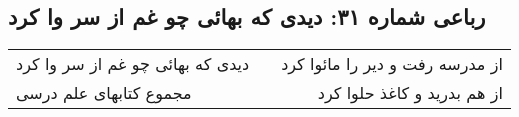 \begin{center}
\section*{رباعی شماره ۳۱: دیدی که بهائی چو غم از سر وا کرد}
\label{sec:031}
\begin{longtable}{l p{0.5cm} r}
دیدی که بهائی چو غم از سر وا کرد
&&
از مدرسه رفت و دیر را مائوا کرد
\\
مجموع کتابهای علم درسی
&&
از هم بدرید و کاغذ حلوا کرد
\\
\end{longtable}
\end{center}
